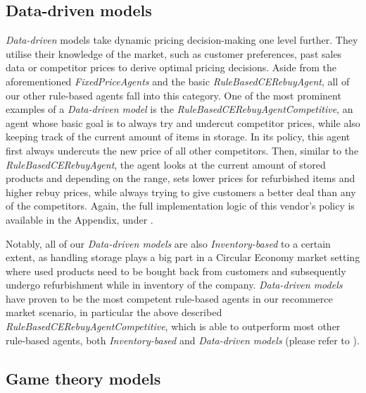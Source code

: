 \subsection{Data-driven models}\label{subsec:DataDrivenModels}

\emph{Data-driven} models take dynamic pricing decision-making one level further. They utilise their knowledge of the market, such as customer preferences, past sales data or competitor prices to derive optimal pricing decisions. Aside from the aforementioned \emph{FixedPriceAgents} and the basic \emph{RuleBasedCERebuyAgent}, all of our other rule-based agents fall into this category. One of the most prominent examples of a \emph{Data-driven model} is the \emph{RuleBasedCERebuyAgentCompetitive}, an agent whose basic goal is to always try and undercut competitor prices, while also keeping track of the current amount of items in storage. In its policy, this agent first always undercuts the new price of all other competitors. Then, similar to the \emph{RuleBasedCERebuyAgent}, the agent looks at the current amount of stored products and depending on the range, sets lower prices for refurbished items and higher rebuy prices, while always trying to give customers a better deal than any of the competitors. Again, the full implementation logic of this vendor's policy is available in the Appendix, under .

Notably, all of our \emph{Data-driven models} are also \emph{Inventory-based} to a certain extent, as handling storage plays a big part in a Circular Economy market setting where used products need to be bought back from customers and subsequently undergo refurbishment while in inventory of the company. \emph{Data-driven models} have proven to be the most competent rule-based agents in our recommerce market scenario, in particular the above described \emph{RuleBasedCERebuyAgentCompetitive}, which is able to outperform most other rule-based agents, both \emph{Inventory-based} and \emph{Data-driven models} (please refer to ).

\subsection{Game theory models}\label{subsec:GameTheory}

